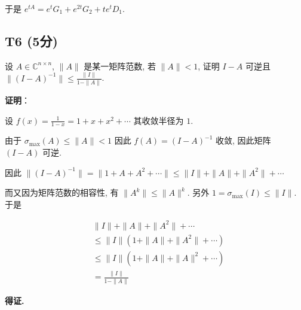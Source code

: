 \documentclass{article}
\begin{document}
于是 $e^{tA}=e^tG_1+e^{2t}G_2+te^{t}D_1$.

\subsection{T6 (5分)}

\par 设 $A\in \mathbb C^{n\times n}$, $\|A\|$ 是某一矩阵范数, 若 $\|A\|<1$, 证明 $I-A$ 可逆且 $\|(I-A)^{-1}\|\leq\frac{\|I\|}{1-\|A\|}$.

\par \textbf{证明}：

设 $f(x)=\frac{1}{1-x}=1+x+x^2+\cdots$ 其收敛半径为 $1$.

由于 $\sigma_{\max}(A)\leq \|A\| < 1$ 因此 $f(A)=(I-A)^{-1}$ 收敛, 因此矩阵 $(I-A)$ 可逆.

因此 $\|(I-A)^{-1}\|=\|1+A+A^2+\cdots\|\leq \|I\|+\|A\|+\|A^2\|+\cdots$

而又因为矩阵范数的相容性, 有 $\|A^k\|\leq \|A\|^k$. 另外 $1 = \sigma_{\max}(I) \leq \|I\|$. 于是

\begin{align*}
	&\|I\|+\|A\|+\|A^2\|+\cdots\\
	&\leq \|I\|(1 + \|A\| + \|A^2\| + \cdots)\\
	&\leq \|I\|(1 + \|A\| + \|A\|^2 + \cdots)\\
	&=\frac{\|I\|}{1-\|A\|}
\end{align*}

\textbf{得证.}
\end{document}
